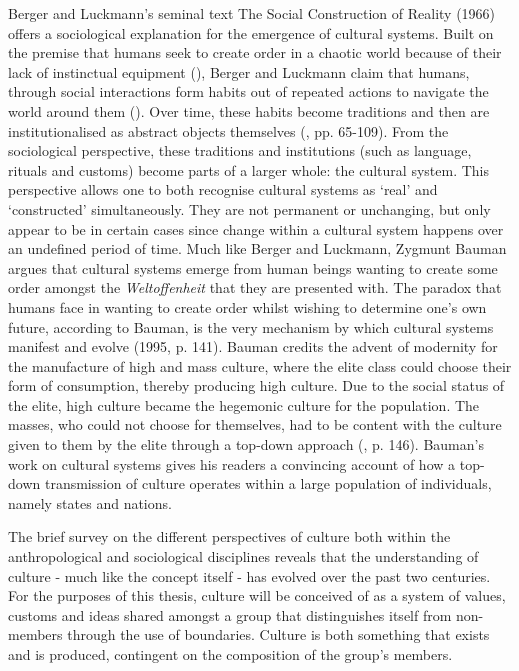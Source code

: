 Berger and Luckmann’s seminal text The Social Construction of Reality (1966) offers a sociological explanation for the emergence of cultural systems. Built on the premise that humans seek to create order in a chaotic world because of their lack of instinctual equipment (\cite{gehlen1980}), Berger and Luckmann claim that humans, through social interactions form habits out of repeated actions to navigate the world around them (\cite{bergerluckmann1966}). Over time, these habits become traditions and then are institutionalised as abstract objects themselves (\cite{bergerluckmann1966}, pp. 65-109). From the sociological perspective, these traditions and institutions (such as language, rituals and customs) become parts of a larger whole: the cultural system. This perspective allows one to both recognise cultural systems as ‘real’ and ‘constructed’ simultaneously. They are not permanent or unchanging, but only appear to be in certain cases since change within a cultural system happens over an undefined period of time. Much like Berger and Luckmann, Zygmunt Bauman argues that cultural systems emerge from human beings wanting to create some order amongst the \emph{Weltoffenheit} that they are presented with. The paradox that humans face in wanting to create order whilst wishing to determine one’s own future, according to Bauman, is the very mechanism by which cultural systems manifest and evolve (1995, p. 141). Bauman credits the advent of modernity for the manufacture of high and mass culture, where the elite class could choose their form of consumption, thereby producing high culture. Due to the social status of the elite, high culture became the hegemonic culture for the population. The masses, who could not choose for themselves, had to be content with the culture given to them by the elite through a top-down approach (\cite{bauman1995}, p. 146). Bauman’s work on cultural systems gives his readers a convincing account of how a top-down transmission of culture operates within a large population of individuals, namely states and nations.

The brief survey on the different perspectives of culture both within the anthropological and sociological disciplines reveals that the understanding of culture - much like the concept itself - has evolved over the past two centuries. For the purposes of this thesis, culture will be conceived of as a system of values, customs and ideas shared amongst a group that distinguishes itself from non-members through the use of boundaries. Culture is both something that exists and is produced, contingent on the composition of the group’s members.

